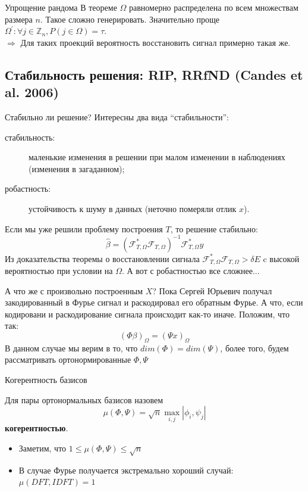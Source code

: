 \documentclass[14pt, fleqn, xcolor={dvipsnames, table}]{beamer}
\begin{document}
\begin{frame}{Упрощение рандома}
В теореме $\Omega$ равномерно распределена по всем множествам размера $n$. Такое сложно генерировать. Значительно проще $\Omega^{'}: \forall j \in \mathbb{Z}_n, P(j \in \Omega) = \tau$. \\
$\Rightarrow$ Для таких проекций вероятность восстановить сигнал примерно такая же.
\end{frame}

\subsection{Стабильность решения: RIP, RRfND (Candes et al. 2006)}
\begin{frame}{Стабильно ли решение?}
\small
Интересны два вида ``стабильности'':
\begin{description}
  \item[стабильность:] маленькие изменения в решении при малом изменении в наблюдениях (изменения в загаданном);
  \item[робастность:] устойчивость к шуму в данных (неточно померяли отлик $x$).
\end{description}
Если мы уже решили проблему построения $T$, то решение стабильно:
$$
\hat{\beta} = (\mathcal{F}^*_{T,\Omega}\mathcal{F}_{T,\Omega})^{-1}\mathcal{F}^*_{T,\Omega}y
$$
Из доказательства теоремы о восстановлении сигнала $\mathcal{F}^*_{T,\Omega}\mathcal{F}_{T,\Omega} > \delta E$ c высокой вероятностью при условии на $\Omega$. А вот с робастностью все сложнее...
\end{frame}

\begin{frame}{А что же с произвольно построенным $X$?}
Пока Сергей Юрьевич получал закодированный в Фурье сигнал и раскодировал его обратным Фурье. А что, если кодировани и раскодирование сигнала происходит как-то иначе. Положим, что так:
$$
(\Phi \beta)_\Omega = (\Psi x)_\Omega
$$
В данном случае мы верим в то, что $dim(\Phi)=dim(\Psi)$, более того, будем рассматривать ортонормированные $\Phi, \Psi$

\end{frame}

\begin{frame}{Когерентность базисов}
\small
\begin{definition}
Для пары ортонормальных базисов назовем
$$
\mu(\Phi, \Psi) = \sqrt{n}\max_{i,j} |\phi_i, \psi_j|
$$
\textbf{когерентностью}.
\end{definition}
\begin{itemize}
  \item Заметим, что $1 \le \mu(\Phi,\Psi) \le \sqrt{n}$
  \item В случае Фурье получается экстремально хороший случай: $\mu(DFT,IDFT) = 1$
\end{itemize}
\end{frame}
\end{document}
